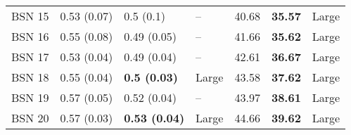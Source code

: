 \begin{tabular}{lllllll}
 BSN 15 &       0.53 (0.07) &             0.5 (0.1) &          -- &                   40.68 &           \textbf{35.57} &       Large \\
 BSN 16 &       0.55 (0.08) &           0.49 (0.05) &          -- &                   41.66 &           \textbf{35.62} &       Large \\
 BSN 17 &       0.53 (0.04) &           0.49 (0.04) &          -- &                   42.61 &           \textbf{36.67} &       Large \\
 BSN 18 &       0.55 (0.04) &   \textbf{0.5 (0.03)} &       Large &                   43.58 &           \textbf{37.62} &       Large \\
 BSN 19 &       0.57 (0.05) &           0.52 (0.04) &          -- &                   43.97 &           \textbf{38.61} &       Large \\
 BSN 20 &       0.57 (0.03) &  \textbf{0.53 (0.04)} &       Large &                   44.66 &           \textbf{39.62} &       Large \\
\bottomrule
\end{tabular}
